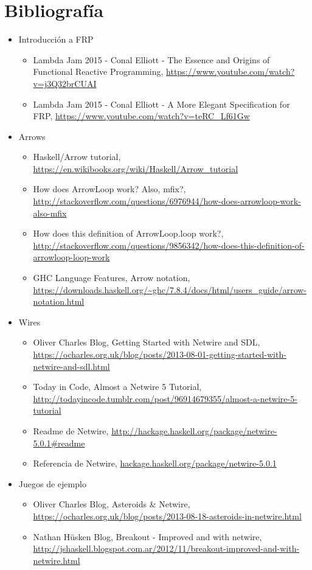 \documentclass[12pt]{article}
\begin{document}
\section{Bibliografía}
\begin{itemize}
\item Introducción a FRP
\begin{itemize}
\item Lambda Jam 2015 - Conal Elliott - The Essence and Origins of Functional Reactive Programming,
\url{https://www.youtube.com/watch?v=j3Q32brCUAI}
\item Lambda Jam 2015 - Conal Elliott - A More Elegant Specification for FRP, \url{https://www.youtube.com/watch?v=teRC_Lf61Gw}
\end{itemize}
\item Arrows
\begin{itemize}
\item Haskell/Arrow tutorial, \url{https://en.wikibooks.org/wiki/Haskell/Arrow_tutorial}
\item How does ArrowLoop work? Also, mfix?, \url{http://stackoverflow.com/questions/6976944/how-does-arrowloop-work-also-mfix}
\item How does this definition of ArrowLoop.loop work?, \url{http://stackoverflow.com/questions/9856342/how-does-this-definition-of-arrowloop-loop-work}
\item GHC Language Features, Arrow notation, \url{https://downloads.haskell.org/~ghc/7.8.4/docs/html/users_guide/arrow-notation.html}
\end{itemize}
\item Wires
\begin{itemize}
\item Oliver Charles Blog, Getting Started with Netwire and SDL, \url{https://ocharles.org.uk/blog/posts/2013-08-01-getting-started-with-netwire-and-sdl.html}
\item Today in Code, Almost a Netwire 5 Tutorial, \url{http://todayincode.tumblr.com/post/96914679355/almost-a-netwire-5-tutorial}
\item Readme de Netwire, \url{http://hackage.haskell.org/package/netwire-5.0.1#readme}
\item Referencia de Netwire, \url{hackage.haskell.org/package/netwire-5.0.1}

\end{itemize}
\item Juegos de ejemplo
\begin{itemize}
\item Oliver Charles Blog, Asteroids \& Netwire, \url{
https://ocharles.org.uk/blog/posts/2013-08-18-asteroids-in-netwire.html}
\item Nathan Hüsken Blog, Breakout - Improved and with netwire, \url{http://jshaskell.blogspot.com.ar/2012/11/breakout-improved-and-with-netwire.html}
\end{itemize}
\end{itemize}
\end{document}
